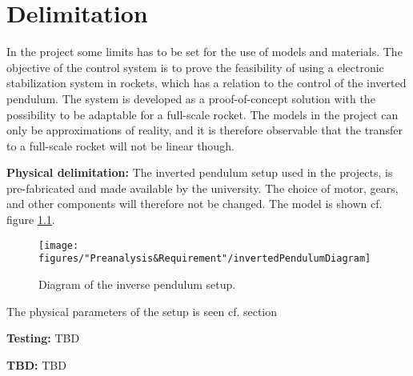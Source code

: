 \chapter{Delimitation}
In the project some limits has to be set for the use of models and materials. The objective of the control system is to prove the feasibility of using a electronic stabilization system in rockets, which has a relation to the control of the inverted pendulum. The system is developed as a proof-of-concept solution with the possibility to be adaptable for a full-scale rocket. The models in the project can only be approximations of reality, and it is therefore observable that the transfer to a full-scale rocket will not be linear though.        

\textbf{Physical delimitation:}
The inverted pendulum setup used in the projects, is pre-fabricated and made available by the university. The choice of motor, gears, and other components will therefore not be changed. The model is shown cf. figure \ref{fig:InvertedPendulum1}.

\begin{figure} [htbp]
	\centering
	\texttt{[image: figures/"Preanalysis\&Requirement"/invertedPendulumDiagram]}
	\caption{Diagram of the inverse pendulum setup.} \label{fig:InvertedPendulum1}
\end{figure}
	
The physical parameters of the setup is seen cf. section 

\textbf{Testing:}
TBD

\textbf{TBD:}
TBD